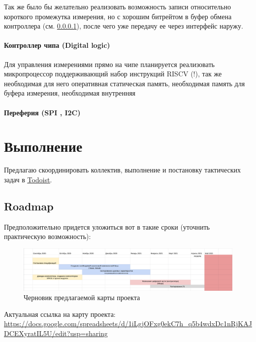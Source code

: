 \documentclass[a4paper,12pt]{article} %
\begin{document}
Так же было бы желательно реализовать возможность записи относительно короткого промежутка измерения, но с хорошим битрейтом в буфер обмена контроллера (см. \ref{digital}), после чего уже передачу ее через интерфейс наружу.

\paragraph{ Контроллер чипа (Digital logic)} \label{digital}

Для управления измерениями прямо на чипе планируется реализовать микропроцессор поддерживающий набор инструкций RISCV (!), так же необходимая для него оперативная статическая память, необходимая память для буфера измерения, необходимая внутренняя 

\paragraph{ Переферия  (SPI , I2C)}



\section{Выполнение}





Предлагаю скоординировать коллектив, выполнение и постановку тактических задач в \underline {\href{todoist.com}{Todoist}}.

\subsection{Roadmap}

Предположительно придется уложиться вот в такие сроки (уточнить практическую возможность):


\begin{figure}[h]
\centering
\includegraphics[width=1.1\textwidth]{roadmap.png}
\caption{ Черновик предлагаемой карты проекта}
\end{figure}

Актуальная ссылка на карту проекта:  \url {https://docs.google.com/spreadsheets/d/1iLgjOFxg0ekC7h_q5b4wdxDc1nRjKAJDCEXyratIL5U/edit?usp=sharing}
\end{document}
